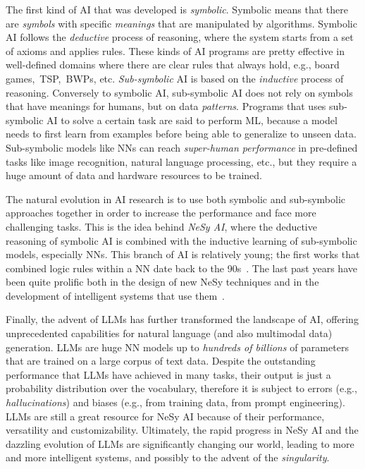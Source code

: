 \begin{refsection}
The first kind of \ac{AI} that was developed is \emph{symbolic}.
%
Symbolic means that there are \emph{symbols} with specific \emph{meanings} that are manipulated by algorithms.
%
Symbolic \ac{AI} follows the \emph{deductive} process of reasoning, where the system starts from a set of axioms and applies rules.
%
These kinds of \ac{AI} programs are pretty effective in well-defined domains where there are clear rules that always hold, e.g., board games,~\ac{TSP},~\acp{BWP}, etc.
%
\emph{Sub-symbolic} \ac{AI} is based on the \emph{inductive} process of reasoning.
%
Conversely to symbolic \ac{AI}, sub-symbolic \ac{AI} does not rely on symbols that have meanings for humans, but on data \emph{patterns}.
%
Programs that uses sub-symbolic \ac{AI} to solve a certain task are said to perform \ac{ML}, because a model needs to first learn from examples before being able to generalize to unseen data.
%
%
Sub-symbolic models like \acp{NN} can reach \emph{super-human performance} in pre-defined tasks like image recognition, natural language processing, etc., but they require a huge amount of data and hardware resources to be trained.


The natural evolution in \ac{AI} research is to use both symbolic and sub-symbolic approaches together in order to increase the performance and face more challenging tasks.
%
This is the idea behind \emph{\ac{NeSy} \ac{AI}}, where the deductive reasoning of symbolic \ac{AI} is combined with the inductive learning of sub-symbolic models, especially \acp{NN}.
%
This branch of \ac{AI} is relatively young; the first works that combined logic rules within a \ac{NN} date back to the 90s~\cite{DBLP:conf/aaai/TowellSN90,DBLP:journals/ai/TowellS94}.
%
The last past years have been quite prolific both in the design of new \ac{NeSy} techniques and in the development of intelligent systems that use them~\cite{DBLP:journals/csur/CiattoSAMO24}.


Finally, the advent of \acp{LLM} has further transformed the landscape of \ac{AI}, offering unprecedented capabilities for natural language (and also multimodal data) generation.
%
\Acp{LLM} are huge \ac{NN} models up to \emph{hundreds of billions} of parameters that are trained on a large corpus of text data.
%
Despite the outstanding performance that \acp{LLM} have achieved in many tasks, their output is just a probability distribution over the vocabulary, therefore it is subject to errors (e.g., \emph{hallucinations}) and biases (e.g., from training data, from prompt engineering).
%
\Acp{LLM} are still a great resource for \ac{NeSy} \ac{AI} because of their performance, versatility and customizability.
%
Ultimately, the rapid progress in \ac{NeSy} \ac{AI} and the dazzling evolution of \acp{LLM} are significantly changing our world, leading to more and more intelligent systems, and possibly to the advent of the \emph{singularity}.



\end{refsection}
